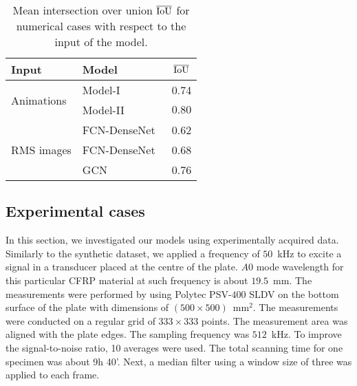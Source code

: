 \begin{sloppypar}
	\begin{table}[ht!]
		\centering
		\caption{Mean intersection over union $\overline{\textup{IoU}}$ for numerical cases with respect to the input of the model.}
		\begin{tabular}{llc}
			\toprule
			Input & Model & $\overline{\textup{IoU}}$ \\ 
			\midrule
			\multirow{2}{*}{Animations} & Model-I & 0.74 \\ & Model-II                    & \(0.80\)    \\ \midrule
			\multirow{3}{*}{RMS images}  & FCN-DenseNet~\cite{Ijjeh2021} & 0.62     \\
			& FCN-DenseNet~\cite{Ijjeh2022} & 0.68     \\
			& GCN~\cite{Ijjeh2022}          & 0.76     \\ 
			\bottomrule
		\end{tabular}
		\label{tab:meanIoU_vs_input}
	\end{table}

	
	\clearpage
	\subsection{Experimental cases}
	In this section, we investigated our models using experimentally acquired data.
	Similarly to the synthetic dataset, we applied a frequency of \(50\)~kHz to excite a signal in a transducer placed at the centre of the plate. 
	\(A0\) mode wavelength for this particular CFRP material at such frequency is about \(19.5\)~mm. 
	The measurements were performed by using Polytec PSV-\(400\) SLDV on the 
	bottom surface of the plate with dimensions of 
	\((500\times500)\)~mm\(^{2}\). 
	The measurements were conducted on a regular grid of \(333\times333\) points. 
	The measurement area was aligned with the plate edges.
	The sampling frequency was \(512\)~kHz.
	To improve the signal-to-noise ratio, 10 averages were used.
	The total scanning time for one specimen was about 9h 40'.
	Next, a median filter using a window size of three was applied to each frame. 


\end{sloppypar}

